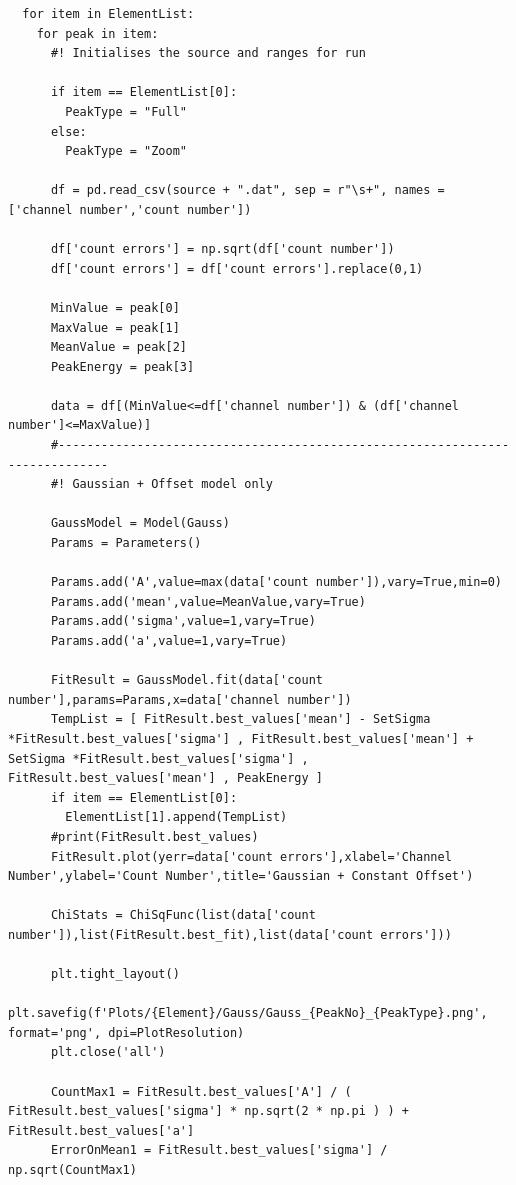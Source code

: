 \documentclass[11pt,a4paper]{article}
\begin{document}
\begin{verbatim}
  for item in ElementList:
    for peak in item:
      #! Initialises the source and ranges for run

      if item == ElementList[0]:
        PeakType = "Full"
      else:
        PeakType = "Zoom"

      df = pd.read_csv(source + ".dat", sep = r"\s+", names = ['channel number','count number'])

      df['count errors'] = np.sqrt(df['count number'])
      df['count errors'] = df['count errors'].replace(0,1)

      MinValue = peak[0]
      MaxValue = peak[1]
      MeanValue = peak[2]
      PeakEnergy = peak[3]

      data = df[(MinValue<=df['channel number']) & (df['channel number']<=MaxValue)]
      #-----------------------------------------------------------------------------
      #! Gaussian + Offset model only

      GaussModel = Model(Gauss)
      Params = Parameters()

      Params.add('A',value=max(data['count number']),vary=True,min=0)
      Params.add('mean',value=MeanValue,vary=True)
      Params.add('sigma',value=1,vary=True)
      Params.add('a',value=1,vary=True)

      FitResult = GaussModel.fit(data['count number'],params=Params,x=data['channel number'])
      TempList = [ FitResult.best_values['mean'] - SetSigma *FitResult.best_values['sigma'] , FitResult.best_values['mean'] + SetSigma *FitResult.best_values['sigma'] , FitResult.best_values['mean'] , PeakEnergy ] 
      if item == ElementList[0]:
        ElementList[1].append(TempList)
      #print(FitResult.best_values)
      FitResult.plot(yerr=data['count errors'],xlabel='Channel Number',ylabel='Count Number',title='Gaussian + Constant Offset')

      ChiStats = ChiSqFunc(list(data['count number']),list(FitResult.best_fit),list(data['count errors']))

      plt.tight_layout()
      plt.savefig(f'Plots/{Element}/Gauss/Gauss_{PeakNo}_{PeakType}.png', format='png', dpi=PlotResolution)
      plt.close('all')

      CountMax1 = FitResult.best_values['A'] / ( FitResult.best_values['sigma'] * np.sqrt(2 * np.pi ) ) + FitResult.best_values['a']
      ErrorOnMean1 = FitResult.best_values['sigma'] / np.sqrt(CountMax1)


\end{verbatim}
\end{document}

